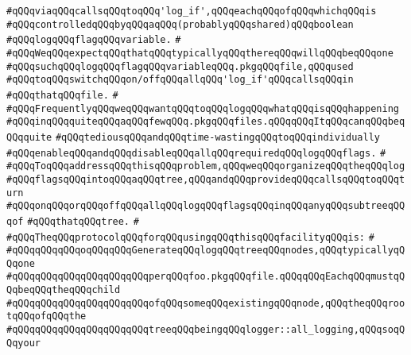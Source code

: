 \verb|#qQQqviaqQQqcallsqQQqtoqQQq'log_if',qQQqeachqQQqofqQQqwhichqQQqis|\newline
\verb|#qQQqcontrolledqQQqbyqQQqaqQQq(probablyqQQqshared)qQQqboolean|\newline
\verb|#qQQqlogqQQqflagqQQqvariable.|\newline
\verb|#|\newline
\verb|#qQQqWeqQQqexpectqQQqthatqQQqtypicallyqQQqthereqQQqwillqQQqbeqQQqone|\newline
\verb|#qQQqsuchqQQqlogqQQqflagqQQqvariableqQQq.pkgqQQqfile,qQQqused|\newline
\verb|#qQQqtoqQQqswitchqQQqon/offqQQqallqQQq'log_if'qQQqcallsqQQqin|\newline
\verb|#qQQqthatqQQqfile.|\newline
\verb|#|\newline
\verb|#qQQqFrequentlyqQQqweqQQqwantqQQqtoqQQqlogqQQqwhatqQQqisqQQqhappening|\newline
\verb|#qQQqinqQQqquiteqQQqaqQQqfewqQQq.pkgqQQqfiles.qQQqqQQqItqQQqcanqQQqbeqQQqquite|\newline
\verb|#qQQqtediousqQQqandqQQqtime-wastingqQQqtoqQQqindividually|\newline
\verb|#qQQqenableqQQqandqQQqdisableqQQqallqQQqrequiredqQQqlogqQQqflags.|\newline
\verb|#|\newline
\verb|#qQQqToqQQqaddressqQQqthisqQQqproblem,qQQqweqQQqorganizeqQQqtheqQQqlog|\newline
\verb|#qQQqflagsqQQqintoqQQqaqQQqtree,qQQqandqQQqprovideqQQqcallsqQQqtoqQQqturn|\newline
\verb|#qQQqonqQQqorqQQqoffqQQqallqQQqlogqQQqflagsqQQqinqQQqanyqQQqsubtreeqQQqof|\newline
\verb|#qQQqthatqQQqtree.|\newline
\verb|#|\newline
\verb|#qQQqTheqQQqprotocolqQQqforqQQqusingqQQqthisqQQqfacilityqQQqis:|\newline
\verb|#|\newline
\verb|#qQQqqQQqqQQqoqQQqqQQqGenerateqQQqlogqQQqtreeqQQqnodes,qQQqtypicallyqQQqone|\newline
\verb|#qQQqqQQqqQQqqQQqqQQqqQQqperqQQqfoo.pkgqQQqfile.qQQqqQQqEachqQQqmustqQQqbeqQQqtheqQQqchild|\newline
\verb|#qQQqqQQqqQQqqQQqqQQqqQQqofqQQqsomeqQQqexistingqQQqnode,qQQqtheqQQqrootqQQqofqQQqthe|\newline
\verb|#qQQqqQQqqQQqqQQqqQQqqQQqtreeqQQqbeingqQQqlogger::all_logging,qQQqsoqQQqyour|\newline
